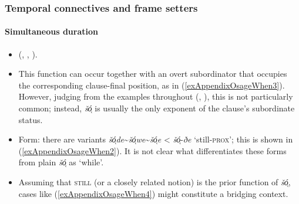 \subsubsection{Temporal connectives and frame setters}
\paragraph{Simultaneous duration}\label{appendixOsageWhile}
\begin{itemize}
	\item \citeauthor{Quintero1997} (\citeyear[305, 362–363]{Quintero1997}, \citeyear[307–308, 444–446]{Quintero2004}, \citeyear[208]{QuinteroDictionary}).
	\item This function can occur together with an overt subordinator that occupies the corresponding clause-final position, as in (\ref{exAppendixOsageWhen3}). However, judging from the examples throughout \citeauthor{Quintero1997} (\citeyear{Quintero1997}, \citeyear{Quintero2004}), this is not particularly common; instead, \textit{šó̜} is usually the only exponent of the clause's subordinate status.
	\item Form: there are variants \textit{šó̜de}\sim\textit{šó̜we}\sim\textit{šó̜e} < \mbox{\textit{šó̜}-\textit{ðe}} \lq still-\textsc{prox}'; this is shown in (\ref{exAppendixOsageWhen2}). It is not clear what differentiates these forms from plain \textit{šó̜} as \lq while'.
	\item Assuming that \textsc{still} (or a closely related notion) is the prior function of \textit{šó̜}, cases like (\ref{exAppendixOsageWhen4}) might constitute a bridging context.
\end{itemize}
